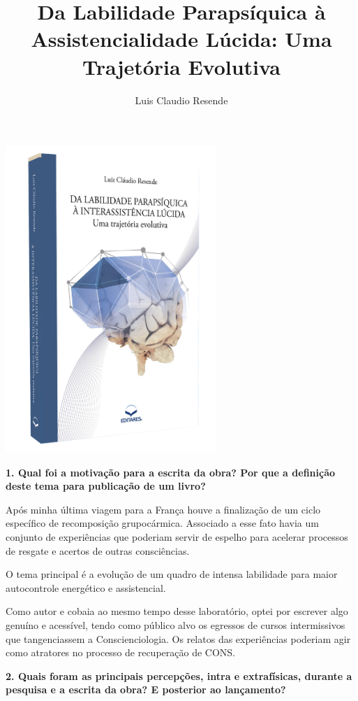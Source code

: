 \documentclass{gescons}
\author{Luis Claudio Resende}
\title{Da Labilidade Parapsíquica à Assistencialidade Lúcida: Uma Trajetória Evolutiva}
\begin{document}
    \makeentrevistatitle

    \begin{multicols}{2}


\begin{center}
    \includegraphics[width=8cm]{articles/entrevista/mockups/Luis_Claudio_Resende-Labilidade.png}
\end{center}

\textbf{1. Qual foi a motivação para a escrita da obra? Por que a definição deste tema para publicação de um livro? }

Após minha última viagem para a França houve a finalização de um ciclo específico de recomposição grupocármica.  Associado a esse fato havia um conjunto de experiências que poderiam servir de espelho para acelerar processos de resgate e acertos de outras consciências.

O tema principal é a evolução de um quadro de intensa labilidade para maior autocontrole energético e assistencial. 

Como autor e cobaia ao mesmo tempo desse laboratório, optei por escrever algo genuíno e acessível, tendo como público alvo os egressos de cursos intermissivos que tangenciassem a Conscienciologia.  Os relatos das experiências poderiam agir como atratores no processo de recuperação de CONS.

\textbf{2.       Quais foram as principais percepções, intra e extrafísicas, durante a pesquisa e a escrita da obra? E posterior ao lançamento?}


\end{multicols}
\end{document}
